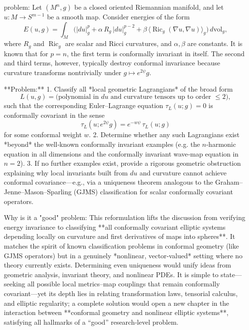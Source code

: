 problem:  
Let \((M^n,g)\) be a closed oriented Riemannian manifold, and let \(u:M\to S^{m-1}\) be a smooth map.  
Consider energies of the form  
\[
E(u,g) = \int_M \big(|du|_g^p + \alpha\,R_g\,|du|_g^{p-2} + \beta\,\langle \operatorname{Ric}_g(\nabla u,\nabla u)\rangle_g\big)\, d\mathrm{vol}_g,
\]
where \(R_g\) and \(\operatorname{Ric}_g\) are scalar and Ricci curvatures, and \(\alpha,\beta\) are constants.  
It is known that for \(p=n\), the first term is conformally invariant in itself.  The second and third terms, however, typically destroy conformal invariance because curvature transforms nontrivially under \(g\mapsto e^{2\psi}g\).

**Problem:**  
1. Classify all *local geometric Lagrangians* of the broad form  
   \[
   L(u,g)=\text{(polynomial in $du$ and curvature tensors up to order $\le2$)},
   \]
   such that the corresponding Euler–Lagrange equation  
   \(\tau_L(u;g)=0\) is conformally covariant in the sense
   \[
   \tau_L(u; e^{2\psi}g) = e^{-w\psi} \,\tau_L(u;g)
   \]
   for some conformal weight \(w\).  
2. Determine whether any such Lagrangians exist *beyond* the well‑known conformally invariant examples (e.g. the \(n\)-harmonic equation in all dimensions and the conformally invariant wave‑map equation in \(n=2\)).  
3. If no further examples exist, provide a rigorous geometric obstruction explaining why local invariants built from \(du\) and curvature cannot achieve conformal covariance—e.g., via a uniqueness theorem analogous to the Graham–Jenne–Mason–Sparling (GJMS) classification for scalar conformally covariant operators.

Why is it a "good" problem:  
This reformulation lifts the discussion from verifying energy invariance to classifying **all conformally covariant elliptic systems depending locally on curvature and first derivatives of maps into spheres**.  It matches the spirit of known classification problems in conformal geometry (like GJMS operators) but in a genuinely *nonlinear, vector‑valued* setting where no theory currently exists.  Determining even uniqueness would unify ideas from geometric analysis, invariant theory, and nonlinear PDEs.  
It is simple to state—seeking all possible local metrics–map couplings that remain conformally covariant—yet its depth lies in relating transformation laws, tensorial calculus, and elliptic regularity; a complete solution would open a new chapter in the interaction between **conformal geometry and nonlinear elliptic systems**, satisfying all hallmarks of a “good” research‑level problem.